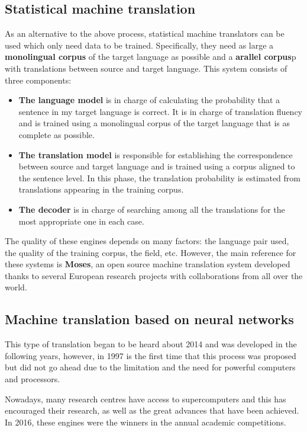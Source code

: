 \documentclass[a4paper]{article}
\theoremstyle{plain}
\theoremstyle{definition}
\begin{document}
    \subsection{Statistical machine translation}
	As an alternative to the above process, statistical machine translators can be used which only need data to be trained. Specifically, they need as large a \textbf{monolingual corpus} of the target language as possible and a \textbf{arallel corpus}p with translations between source and target language. This system consists of three components: 
    \begin{itemize}
        \item \textbf{The language model} is in charge of calculating the probability that a sentence in my target language is correct. It is in charge of translation fluency and is trained using a monolingual corpus of the target language that is as complete as possible.
         \item \textbf{The translation model} is responsible for establishing the correspondence between source and target language and is trained using a corpus aligned to the sentence level. In this phase, the translation probability is estimated from translations appearing in the training corpus.
         \item \textbf{The decoder} is in charge of searching among all the translations for the most appropriate one in each case.
    \end{itemize}
    The quality of these engines depends on many factors: the language pair used, the quality of the training corpus, the field, etc. However, the main reference for these systems is \textbf{Moses}, an open source machine translation system developed thanks to several European research projects with collaborations from all over the world.
	
	\subsection{Machine translation based on neural networks}
	
	This type of translation began to be heard about 2014 and was developed in the following years, however, in 1997 is the first time that this process was proposed but did not go ahead due to the limitation and the need for powerful computers and processors.\newline

         

    Nowadays, many research centres have access to supercomputers and this has encouraged their research, as well as the great advances that have been achieved. In 2016, these engines were the winners in the annual academic competitions.\newline
        
\end{document}
